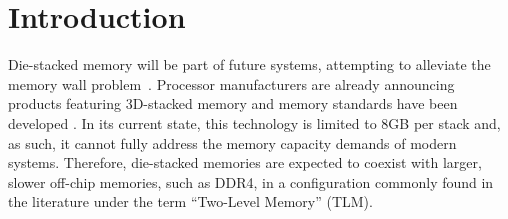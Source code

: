 \section{Introduction}
\label{sec:Introduction}
 


Die-stacked memory will be part of future systems, attempting to alleviate 
the memory wall problem~\cite{wulf-can95}. Processor manufacturers are already announcing products featuring 3D-stacked memory \cite{KnightsLanding,NVIDIA,black-micro2013}  and memory standards have been developed \cite{jedec-wideio,JEDEC-HBM,pawlowski-hotchips2011}. In its current state, this technology is limited to 8GB per stack \cite{JEDEC-HBM-REVISED} and, as such, it cannot fully address the memory capacity demands of modern systems. Therefore, die-stacked memories are expected to coexist with larger, slower off-chip memories, such as DDR4, in a configuration commonly found in the literature under the term ``Two-Level Memory'' (TLM).  

